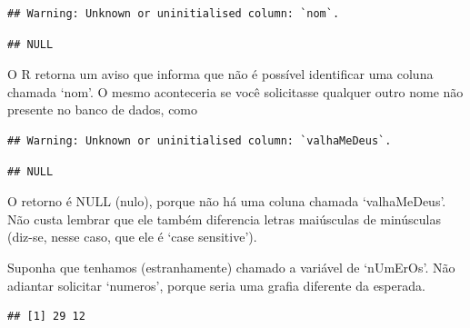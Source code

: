 \documentclass[
]{book}
\newenvironment{Shaded}{\begin{snugshade}}{\end{snugshade}}
\newcommand{\AttributeTok}[1]{\textcolor[rgb]{0.77,0.63,0.00}{#1}}
\newcommand{\CommentTok}[1]{\textcolor[rgb]{0.56,0.35,0.01}{\textit{#1}}}
\newcommand{\DecValTok}[1]{\textcolor[rgb]{0.00,0.00,0.81}{#1}}
\newcommand{\FunctionTok}[1]{\textcolor[rgb]{0.00,0.00,0.00}{#1}}
\newcommand{\NormalTok}[1]{#1}
\newcommand{\OtherTok}[1]{\textcolor[rgb]{0.56,0.35,0.01}{#1}}
\newcommand{\SpecialCharTok}[1]{\textcolor[rgb]{0.00,0.00,0.00}{#1}}
\newcommand{\StringTok}[1]{\textcolor[rgb]{0.31,0.60,0.02}{#1}}
\begin{document}
\begin{verbatim}
## Warning: Unknown or uninitialised column: `nom`.
\end{verbatim}

\begin{verbatim}
## NULL
\end{verbatim}

O R retorna um aviso que informa que não é possível identificar uma coluna chamada `nom'. O mesmo aconteceria se você solicitasse qualquer outro nome não presente no banco de dados, como

\begin{Shaded}
\end{Shaded}

\begin{verbatim}
## Warning: Unknown or uninitialised column: `valhaMeDeus`.
\end{verbatim}

\begin{verbatim}
## NULL
\end{verbatim}

O retorno é NULL (nulo), porque não há uma coluna chamada `valhaMeDeus'. Não custa lembrar que ele também diferencia letras maiúsculas de minúsculas (diz-se, nesse caso, que ele é `case sensitive').

Suponha que tenhamos (estranhamente) chamado a variável de `nUmErOs'. Não adiantar solicitar `numeros', porque seria uma grafia diferente da esperada.

\begin{Shaded}
\end{Shaded}

\begin{verbatim}
## [1] 29 12
\end{verbatim}
\end{document}
